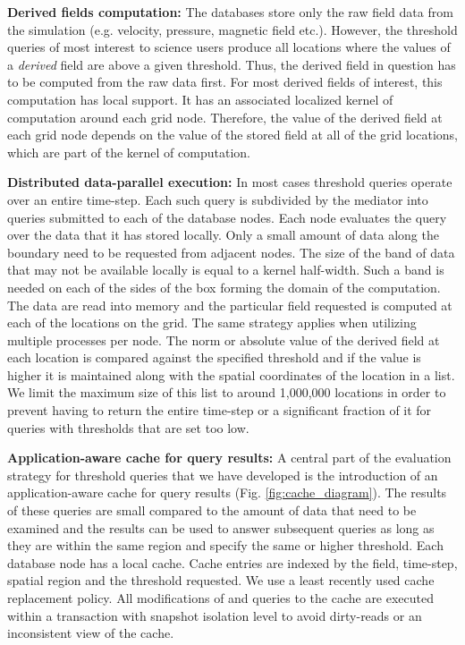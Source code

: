 \documentclass{sig-alternate}
\begin{document}
{\bf Derived fields computation:} The databases store only the raw field data from the simulation (e.g. velocity, pressure, magnetic field etc.). However,
the threshold queries of most interest to science users produce all locations where the values of a \emph{derived} field are above a given threshold. Thus, the
derived field in question has to be computed from the raw data first. For most derived fields of interest, this computation has local support. It has an 
associated localized kernel of computation around each grid node. Therefore, the value of the derived field at each grid node depends on the value of the
stored field at all of the grid locations, which are part of the kernel of computation. 

{\bf Distributed data-parallel execution:} In most cases threshold queries operate over an entire time-step. Each such query is subdivided by 
the mediator into queries submitted to
each of the database nodes. Each node evaluates the query over the data that it has stored locally. Only a small amount of data along the boundary
need to be requested from adjacent nodes. The size of the band of data that may not be available locally is equal to a kernel half-width. 
Such a band is needed on each of the sides of the box forming the domain of the computation.  
The data are read into memory and the particular field requested is computed at each of the locations on
the grid. The same strategy applies when utilizing multiple processes per node. The norm or absolute value of the derived field at each location is compared 
against the specified threshold and if the value is higher it is maintained along with
the spatial coordinates of the location in a list. We limit the maximum size of this list to around 1,000,000 locations in order to prevent having to return
the entire time-step or a significant fraction of it for queries with thresholds that are set too low. 

{\bf Application-aware cache for query results:} A central part of the evaluation strategy for threshold queries that we have developed is the 
introduction of an application-aware cache
for query results (Fig. \ref{fig:cache_diagram}). The results of these queries are small compared to the amount of data that need to be examined and the
results can be used to answer subsequent queries as long as they are within the same region and specify the same or higher threshold. Each database node 
has a local cache. Cache entries are indexed by the field, time-step, spatial region and the threshold requested. We use a least recently
used cache replacement policy. All modifications of and queries to the cache are executed within a transaction with snapshot isolation level to
avoid dirty-reads or an inconsistent view of the cache. 
\end{document}
